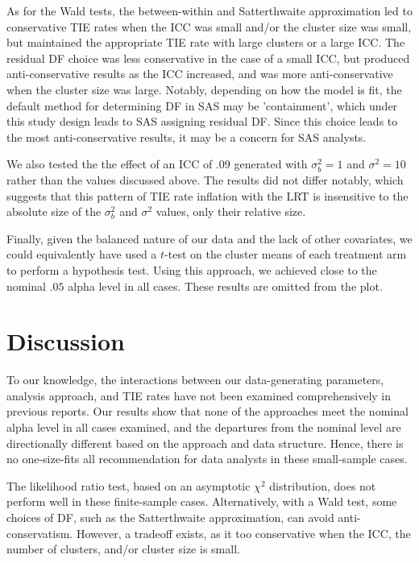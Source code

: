 \documentclass[twocolumn]{bmcart}%
\begin{document}
As for the Wald tests, the between-within and Satterthwaite approximation led to conservative TIE rates when the ICC was small and/or the cluster size was small, but maintained the appropriate TIE rate with large clusters or a large ICC. The residual DF choice was less conservative in the case of a small ICC, but produced anti-conservative results as the ICC increased, and was more anti-conservative when the cluster size was large. Notably, depending on how the model is fit, the default method for determining DF in SAS may be 'containment', which under this study design leads to SAS assigning residual DF. Since this choice leads to the most anti-conservative results, it may be a concern for SAS analysts.

We also tested the the effect of an ICC of .09 generated with $\sigma^2_b = 1$ and $\sigma^2 = 10$ rather than the values discussed above. The results did not differ notably, which suggests that this pattern of TIE rate inflation with the LRT is insensitive to the absolute size of the $\sigma^2_b$ and $\sigma^2$ values, only their relative size.

Finally, given the balanced nature of our data and the lack of other covariates, we could equivalently have used a $t$-test on the cluster means of each treatment arm to perform a hypothesis test. Using this approach, we achieved close to the nominal $.05$ alpha level in all cases. These results are omitted from the plot.

\section*{Discussion}


To our knowledge, the interactions between our data-generating parameters, analysis approach, and TIE rates have not been examined comprehensively in previous reports. Our results show that none of the approaches meet the nominal alpha level in all cases examined, and the departures from the nominal level are directionally different based on the approach and data structure. Hence, there is no one-size-fits all recommendation for data analysts in these small-sample cases.

The likelihood ratio test, based on an asymptotic $\chi^2$ distribution, does not perform well in these finite-sample cases. Alternatively, with a Wald test, some choices of DF, such as the Satterthwaite approximation, can avoid anti-conservatism. However, a tradeoff exists, as it too conservative when the ICC, the number of clusters, and/or cluster size is small. 
\end{document}
